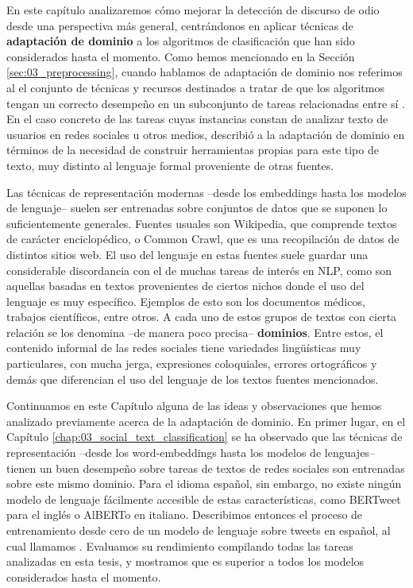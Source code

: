 \label{chap:07_domain_adaptation}
\newcommand{\deacc}[0]{\textbf{deacc}}
\newcommand{\cased}[0]{\textbf{cased}}
\newcommand{\uncased}[0]{\textbf{uncased}}

En este capítulo analizaremos cómo mejorar la detección de discurso de odio desde una perspectiva más general, centrándonos en aplicar técnicas de \textbf{adaptación de dominio} a los algoritmos de clasificación que han sido considerados hasta el momento. Como hemos mencionado en la Sección \ref{sec:03_preprocessing}, cuando hablamos de adaptación de dominio nos referimos al el conjunto de técnicas y recursos destinados a tratar de que los algoritmos tengan un correcto desempeño en un subconjunto de tareas relacionadas entre sí \cite{goodfellow2016deep}. En el caso concreto de las tareas cuyas instancias constan de analizar texto de usuarios en redes sociales u otros medios, \citet{eisenstein2013bad} describió a la adaptación de dominio en términos de la necesidad de construir herramientas propias para este tipo de texto, muy distinto al lenguaje formal proveniente de otras fuentes.

Las técnicas de representación modernas --desde los embeddings hasta los modelos de lenguaje-- suelen ser entrenadas sobre conjuntos de datos que se suponen lo suficientemente generales. Fuentes usuales son Wikipedia, que comprende textos de carácter enciclopédico, o Common Crawl, que es una recopilación de datos de distintos sitios web. El uso del lenguaje en estas fuentes suele guardar una considerable discordancia con el de muchas tareas de interés en NLP, como son aquellas basadas en textos provenientes de ciertos nichos donde el uso del lenguaje es muy específico. Ejemplos de esto son los documentos médicos, trabajos científicos, entre otros. A cada uno de estos grupos de textos con cierta relación se los denomina --de manera poco precisa-- \textbf{dominios}. Entre estos, el contenido informal de las redes sociales tiene variedades lingüísticas muy particulares, con mucha jerga, expresiones coloquiales, errores ortográficos y demás que diferencian el uso del lenguaje de los textos fuentes mencionados.

Continuamos en este Capítulo alguna de las ideas y observaciones que hemos analizado previamente acerca de la adaptación de dominio. En primer lugar, en el Capítulo \ref{chap:03_social_text_classification} se ha observado que las técnicas de representación --desde los word-embeddings hasta los modelos de lenguajes-- tienen un buen desempeño sobre tareas de textos de redes sociales son entrenadas sobre este mismo dominio. Para el idioma español, sin embargo, no existe ningún modelo de lenguaje fácilmente accesible de estas características, como BERTweet para el inglés o AlBERTo en italiano. Describimos entonces el proceso de entrenamiento desde cero de un modelo de lenguaje sobre tweets en español, al cual llamamos \robertuito{}. Evaluamos su rendimiento compilando todas las tareas analizadas en esta tesis, y mostramos que es superior a todos los modelos considerados hasta el momento.

